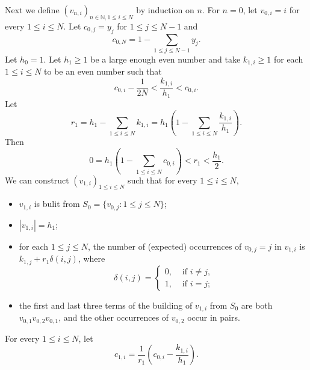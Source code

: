 \documentclass{amsart}
\theoremstyle{definition}
\theoremstyle{problem}
\theoremstyle{remark}
\numberwithin{equation}{section}
\begin{document}
Next we define $(v_{n,i})_{n\in\mathbb{N},1\le i\le N}$ by induction on $n$. For $n=0$, let $v_{0,i}=i$ for every $1\le i\le N$. Let $c_{0,j}=y_j$ for $1\le j\le N-1$ and 
$$c_{0,N}=1-\sum_{1\le j\le N-1}y_j.$$ Let $h_0=1$. Let $h_1\ge1$ be a large enough even number and take $k_{1,i}\ge1$ for each $1\le i\le N$ to be an even number such that $$c_{0,i}-\frac{1}{2N}< \displaystyle\frac{k_{1,i}}{h_1}< c_{0,i}.$$ 
Let 
$$r_1=h_1-\sum_{1\le i\le N} k_{1,i}=h_1\left(1-\sum_{1\leq i\leq N}\frac{k_{1,i}}{h_1}\right). $$
Then 
$$ 0=h_1\left(1-\sum_{1\leq i\leq N} c_{0,i}\right)<r_1<\frac{h_1}{2}. $$
We can construct $(v_{1,i})_{1\le i\le N}$ such that for every $1\le i\le N$,
\begin{itemize}
\item $v_{1,i}$ is bulit from $S_0=\{v_{0,j}\colon 1\le j\le N\}$;
\item $|v_{1,i}|=h_1$;
\item for each $1\leq j\leq N$, the number of (expected) occurrences of $v_{0,j}=j$ in $v_{1,i}$ is $k_{1,j}+r_1\delta(i,j)$, where 
$$ \delta(i,j)=\left\{\begin{array}{ll} 0, & \mbox{ if $i\neq j$,} \\
1, & \mbox{ if $i=j$;}\end{array}\right.
$$
\item the first and last three terms of the building of $v_{1,i}$ from $S_0$ are both $v_{0,1}v_{0,2}v_{0,1}$, and the other occurrences of $v_{0,2}$ occur in pairs.
\end{itemize}
For every $1\le i\le N$, let 
$$c_{1,i}=\displaystyle\frac{1}{r_{1}}\left(c_{0,i}-\displaystyle\frac{k_{1,i}}{h_{1}}\right).$$ 
\end{document}
